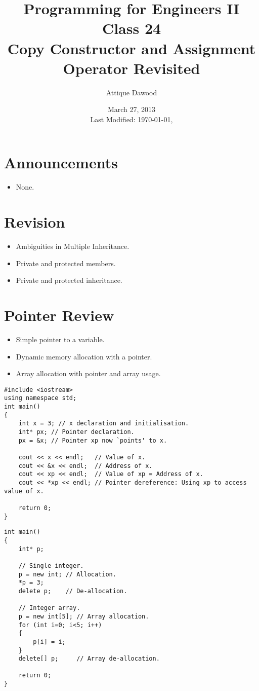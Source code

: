 \documentclass[12pt,a4paper]{article}
\title{\vspace{-2cm}Programming for Engineers II\\Class 24\\Copy Constructor and Assignment Operator Revisited}
\author{Attique Dawood}
\date{March 27, 2013\\[0.2cm] Last Modified: \today, \currenttime}
\begin{document}
\maketitle
\section{Announcements}
\begin{itemize}
\item None.
\end{itemize}
\section{Revision}
\begin{itemize}
\item Ambiguities in Multiple Inheritance.
\item Private and protected members.
\item Private and protected inheritance.
\end{itemize}
\section{Pointer Review}
\begin{itemize}
\item Simple pointer to a variable.
\item Dynamic memory allocation with a pointer.
\item Array allocation with pointer and array usage.
\end{itemize}
\begin{lstlisting}[caption={Pointer Basics}]
#include <iostream>
using namespace std;
int main()
{
	int x = 3; // x declaration and initialisation.
	int* px; // Pointer declaration.
	px = &x; // Pointer xp now `points' to x.
	
	cout << x << endl;   // Value of x.
	cout << &x << endl;  // Address of x.
	cout << xp << endl;  // Value of xp = Address of x.
	cout << *xp << endl; // Pointer dereference: Using xp to access value of x.
	
	return 0;
}
\end{lstlisting}
\begin{lstlisting}[caption={Dynamic memory allocation with pointer}]
int main()
{
	int* p;
	
	// Single integer.
	p = new int; // Allocation.
	*p = 3;
	delete p;    // De-allocation.
	
	// Integer array.
	p = new int[5]; // Array allocation.
	for (int i=0; i<5; i++)
	{
		p[i] = i;
	}		
	delete[] p;     // Array de-allocation.
	
	return 0;
}
\end{lstlisting}
\end{document}
